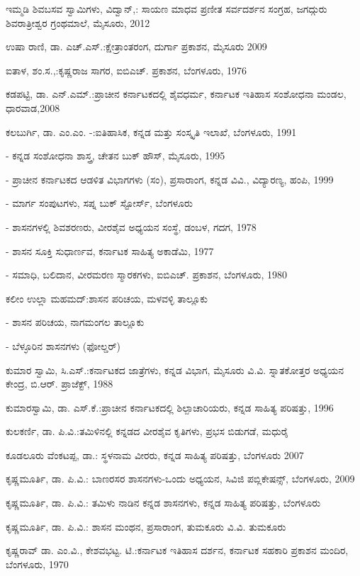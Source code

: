\noindent
ಇಮ್ಮಡಿ ಶಿವಬಸವ ಸ್ವಾಮಿಗಳು, ವಿದ್ವಾನ್​,: ಸಾಯಣ ಮಾಧವ ಪ್ರಣೀತ ಸರ್ವದರ್ಶನ ಸಂಗ್ರಹ, ಜಗದ್ಗುರು ಶಿವರಾತ್ರೀಶ್ವರ ಗ್ರಂಥಮಾಲೆ, ಮೈಸೂರು, 2012

\noindent
ಉಷಾ ರಾಣಿ, ಡಾ. ಎಚ್​.ಎಸ್​.:ಕ್ಷೇತ್ರಾಂತರಂಗ, ದುರ್ಗಾ ಪ್ರಕಾಶನ, ಮೈಸೂರು 2009

\noindent
ಐತಾಳ, ಶಂ.ಸ.,:ಕೃಷ್ಣರಾಜ ಸಾಗರ, ಐಬಿಎಚ್​. ಪ್ರಕಾಶನ, ಬೆಂಗಳೂರು, 1976

\noindent
ಕಡಪಟ್ಟಿ, ಡಾ. ಎನ್​.ಎಮ್.:ಪ್ರಾಚೀನ ಕರ್ನಾಟಕದಲ್ಲಿ ಶೈವಧರ್ಮ, ಕರ್ನಾಟಕ ಇತಿಹಾಸ ಸಂಶೋಧನಾ ಮಂಡಲ, ಧಾರವಾಡ,2008

\noindent
ಕಲಬುರ್ಗಿ, ಡಾ. ಎಂ.ಎಂ. -:ಐತಿಹಾಸಿಕ, ಕನ್ನಡ ಮತ್ತು ಸಂಸ್ಕೃತಿ ಇಲಾಖೆ, ಬೆಂಗಳೂರು, 1991

- ಕನ್ನಡ ಸಂಶೋಧನಾ ಶಾಸ್ತ್ರ, ಚೇತನ ಬುಕ್​ ಹೌಸ್​, ಮೈಸೂರು, 1995

- ಪ್ರಾಚೀನ ಕರ್ನಾಟಕದ ಆಡಳಿತ ವಿಭಾಗಗಳು (ಸಂ), ಪ್ರಸಾರಾಂಗ, ಕನ್ನಡ ವಿವಿ., ವಿದ್ಯಾರಣ್ಯ, ಹಂಪಿ, 1999

- ಮಾರ್ಗ ಸಂಪುಟಗಳು, ಸಪ್ನ ಬುಕ್​ ಸ್ಟೋರ್ಸ್, ಬೆಂಗಳೂರು 

- ಶಾಸನಗಳಲ್ಲಿ ಶಿವಶರಣರು, ವೀರಶೈವ ಅಧ್ಯಯನ ಸಂಸ್ಥೆ, ಡಂಬಳ, ಗದಗ, 1978

- ಶಾಸನ ಸೂಕ್ತಿ ಸುಧಾರ್ಣವ, ಕರ್ನಾಟಕ ಸಾಹಿತ್ಯ ಅಕಾಡೆಮಿ, 1977

- ಸಮಾಧಿ, ಬಲಿದಾನ, ವೀರಮರಣ ಸ್ಮಾರಕಗಳು, ಐಬಿಎಚ್​. ಪ್ರಕಾಶನ, ಬೆಂಗಳೂರು, 1980

\noindent
ಕಲೀಂ ಉಲ್ಲಾ ಮಹಮದ್​:ಶಾಸನ ಪರಿಚಯ, ಮಳವಳ್ಳಿ ತಾಲ್ಲೂಕು

- ಶಾಸನ ಪರಿಚಯ, ನಾಗಮಂಗಲ ತಾಲ್ಲೂಕು

- ಬೆಳ್ಳೂರಿನ ಶಾಸನಗಳು (ಫೋಲ್ಡರ್​)

\noindent
ಕುಮಾರ ಸ್ವಾಮಿ, ಸಿ.ಎಸ್​.:ಕರ್ನಾಟಕದ ಜಾತ್ರೆಗಳು, ಕನ್ನಡ ವಿಭಾಗ, ಮೈಸೂರು ವಿ.ವಿ. ಸ್ನಾತಕೋತ್ತರ ಅಧ್ಯಯನ ಕೇಂದ್ರ, ಬಿ.ಆರ್​. ಪ್ರಾಜೆಕ್ಟ್​, 1988

\noindent
ಕುಮಾರಸ್ವಾಮಿ, ಡಾ. ಎಸ್​.ಕೆ.:ಪ್ರಾಚೀನ ಕರ್ನಾಟಕದಲ್ಲಿ ಶಿಲ್ಪಾಚಾರಿಯರು, ಕನ್ನಡ ಸಾಹಿತ್ಯ ಪರಿಷತ್ತು, 1996

\noindent
ಕುಲಕರ್ಣಿ, ಡಾ. ಪಿ.ವಿ.:ತಮಿಳಿನಲ್ಲಿ ಕನ್ನಡದ ವೀರಶೈವ ಕೃತಿಗಳು, ಪ್ರಭಸ ಬಿಡುಗಡೆ, ಮಧುರೈ

\noindent
ಕೂಡಲೂರು ವೆಂಕಟಪ್ಪ, ಡಾ.: ಸ್ಥಳನಾಮ ವೀರರು, ಕನ್ನಡ ಸಾಹಿತ್ಯ ಪರಿಷತ್ತು, ಬೆಂಗಳೂರು 2007

\noindent
ಕೃಷ್ಣಮೂರ್ತಿ, ಡಾ. ಪಿ.ವಿ.: ಬಾಣರಸರ ಶಾಸನಗಳು-ಒಂದು ಅಧ್ಯಯನ, ಸಿವಿಜಿ ಪಬ್ಲಿಕೇಷನ್ಸ್​, ಬೆಂಗಳೂರು, 2009

\noindent
ಕೃಷ್ಣಮೂರ್ತಿ, ಡಾ. ಪಿ.ವಿ.: ತಮಿಳು ನಾಡಿನ ಕನ್ನಡ ಶಾಸನಗಳು, ಕನ್ನಡ ಸಾಹಿತ್ಯ ಪರಿಷತ್ತು, ಬೆಂಗಳೂರು

\noindent
ಕೃಷ್ಣಮೂರ್ತಿ, ಡಾ. ಪಿ.ವಿ.: ಶಾಸನ ಮಂಥನ, ಪ್ರಸಾರಾಂಗ, ತುಮಕೂರು ವಿ.ವಿ. ತುಮಕೂರು

\noindent
ಕೃಷ್ಣರಾವ್​ ಡಾ. ಎಂ.ವಿ., ಕೇಶವಭಟ್ಟ. ಟಿ.:ಕರ್ನಾಟಕ ಇತಿಹಾಸ ದರ್ಶನ, ಕರ್ನಾಟಕ ಸಹಕಾರಿ ಪ್ರಕಾಶನ ಮಂದಿರ, ಬೆಂಗಳೂರು, 1970

